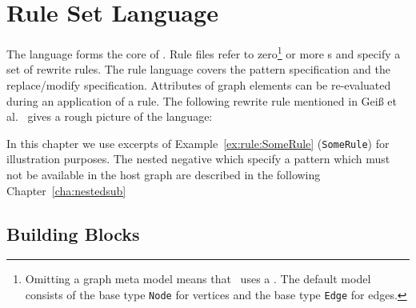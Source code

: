 \chapter{Rule Set Language}
\label{chaprulelang}

The  language forms the core of \GrG. Rule files refer to zero\footnote{Omitting a graph meta model means that \GrG\ uses a . The default model consists of the base type \texttt{Node} for vertices and the base type \texttt{Edge} for edges.} or more s and specify a set of rewrite rules. The rule language covers the pattern specification and the replace/modify specification. Attributes of graph elements can be re-evaluated during an application of a rule. The following rewrite rule mentioned in Geiß et al.~\cite{GBGHS:06} gives a rough picture of the language:
\begin{example}\label{ex:rule:SomeRule}
\end{example}
In this chapter we use excerpts of Example~\ref{ex:rule:SomeRule} (\texttt{SomeRule}) for illustration purposes.
The nested negative which specify a pattern which must not be available in the host graph are described in the following Chapter~\ref{cha:nestedsub}


\section{Building Blocks}
\label{rulebb}

